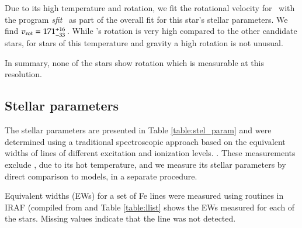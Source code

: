 Due to its high temperature and rotation, we fit the rotational velocity for \starb\ with the program \textit{sfit}\ \citep[][described in section \ref{sec:stellar-parameters}]{2001A&A...376..497J}  as part of the overall fit for this star's stellar parameters.  We find $v_{\rm rot}=171^{+16}_{-33}$\,\kms. While \starb's rotation is very high compared to the other candidate stars,  for stars of this temperature and gravity a high rotation is not unusual.


In summary, none of the stars show rotation which is measurable at this resolution.


\subsection{Stellar parameters}
\label{sec:stellar-parameters}
The stellar parameters are presented in Table \ref{table:stel_param} and were determined using a traditional spectroscopic approach based on the equivalent widths of lines of different excitation and ionization levels. . These measurements exclude \starb, due to its hot temperature, and we measure its stellar parameters by direct comparison to models, in a separate procedure.

Equivalent widths (EWs) for a set of Fe lines were measured using routines in IRAF (compiled from \citet[][henceforth Reddy03]{2003MNRAS.340..304R} and \citet[][henceforth RC02]{2002AJ....123.3277R} Table \ref{table:llist} shows the EWs measured for each of the stars. Missing values indicate that the line was not detected. 

